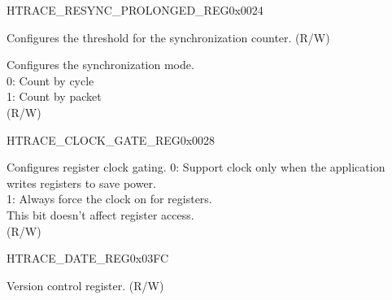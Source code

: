 \begin{register}{H}{TRACE\_RESYNC\_PROLONGED\_REG}{0x0024}\label{regdesc:TRACERESYNCPROLONGEDREG}
%
%
%
\regnewline%
\begin{regdesc}\begin{reglist}
\label{fielddesc:TRACERESYNCPROLONGED}\item [TRACE\_RESYNC\_PROLONGED] Configures the threshold for the synchronization counter. (R/W)
\label{fielddesc:TRACERESYNCMODE}\item [TRACE\_RESYNC\_MODE] Configures the synchronization mode.\\
0: Count by cycle\\
1: Count by packet\\ (R/W)
\end{reglist}\end{regdesc}
\end{register}


\begin{register}{H}{TRACE\_CLOCK\_GATE\_REG}{0x0028}\label{regdesc:TRACECLOCKGATEREG}
%
%
\regnewline%
\begin{regdesc}\begin{reglist}
\label{fielddesc:TRACECLKEN}\item [TRACE\_CLK\_EN] Configures register clock gating.
0: Support clock only when the application writes registers to save power.\\ 
1: Always force the clock on for registers.\\
 This bit doesn't affect register access.\\(R/W)
\end{reglist}\end{regdesc}
\end{register}


\begin{register}{H}{TRACE\_DATE\_REG}{0x03FC}\label{regdesc:TRACEDATEREG}
%
%
\regnewline%
\begin{regdesc}\begin{reglist}
\label{fielddesc:TRACEDATE}\item [TRACE\_DATE] Version control register. (R/W)
\end{reglist}\end{regdesc}
\end{register}
